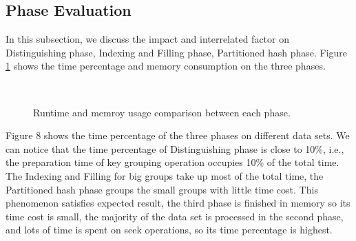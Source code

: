 \subsection{Phase Evaluation}
In this subsection, we discuss the impact and interrelated factor on Distinguishing phase, Indexing and Filling phase, Partitioned hash phase. Figure \ref{fig: PhaseEvaluation} shows the time percentage and memory consumption on the three phases. 
\begin{figure}[htbp]	
	\label{fig: PhaseEvaluation}
    \hspace{0.23cm}
    \\    
	\caption{Runtime and memroy usage comparison between each phase.}
		
\end{figure}

Figure 8 shows the time percentage of the three phases on different data sets. We can notice that the time percentage of Distinguishing phase is close to 10\%, i.e., the preparation time of key grouping operation occupies 10\% of the total time. The Indexing and Filling for big groups take up most of the total time, the Partitioned hash phase groups the small groups with little time cost. This phenomenon satisfies expected result, the third phase is finished in memory so its time cost is small, the majority of the data set is processed in the second phase, and lots of time is spent on seek operations, so its time percentage is highest.

